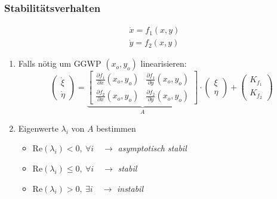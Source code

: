     \subsubsection{Stabilitätsverhalten}
        \vspace{-1em}
        \begin{align*}
            \dot{x} = f_1(x,y)\\
            \dot{y} = f_2(x,y)
        \end{align*}
        \vspace{-0.75em}
        \begin{enumerate}
            \item Falls nötig um GGWP $(x_o,y_o)$ linearisieren:
                  $$
                    \begin{pmatrix}
                        \dot{\xi}\\[0.5em] \dot{\eta}
                    \end{pmatrix}
                    =
                    \underbrace{\begin{bmatrix}
                        \frac{\partial f_1}{\partial x}(x_o, y_o) & \frac{\partial f_1}{\partial y}(x_o, y_o)\\[0.5em]
                        \frac{\partial f_2}{\partial x}(x_o, y_o) & \frac{\partial f_2}{\partial y}(x_o, y_o)
                    \end{bmatrix}}_{A}
                    \cdot 
                    \begin{pmatrix}
                        \xi\\[0.5em] \eta
                    \end{pmatrix}
                    +
                    \begin{pmatrix}
                        K_{f_1}\\[0.5em] K_{f_2}
                    \end{pmatrix}
                  $$
            \item Eigenwerte $\lambda_i$ von $A$ bestimmen
            \begin{itemize}
                \item Re$(\lambda_i) < 0, \ \forall i \quad \to $ \textit{asymptotisch stabil}
                \item Re$(\lambda_i) \leq 0, \ \forall i \quad \to $ \textit{stabil}
                \item Re$(\lambda_i) > 0, \ \exists i \quad \to $ \textit{instabil}
            \end{itemize}
        \end{enumerate}
    
